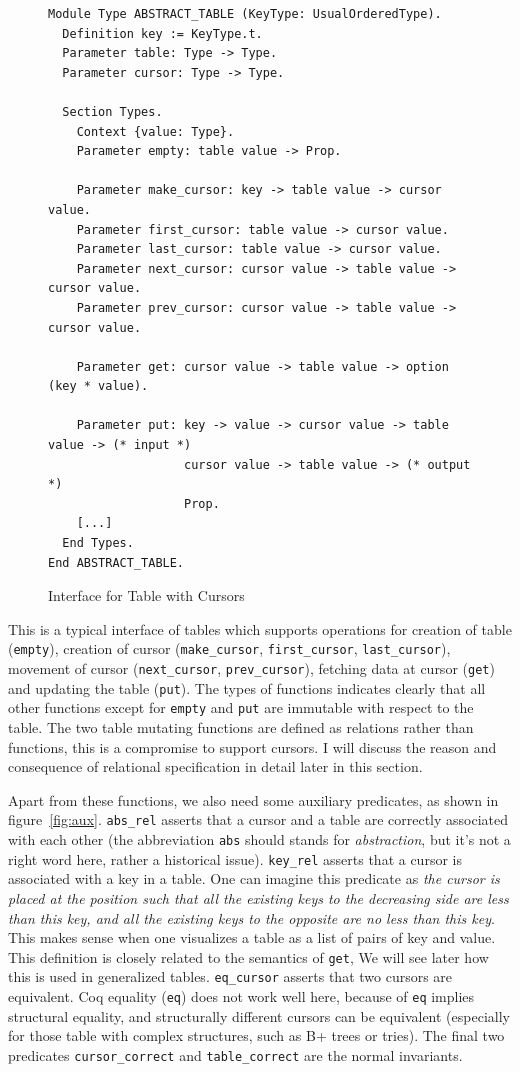 \documentclass[runningheads]{llncs}
\begin{document}
\begin{figure}[htbp]
  \centering
  \begin{verbatim}
Module Type ABSTRACT_TABLE (KeyType: UsualOrderedType).
  Definition key := KeyType.t.
  Parameter table: Type -> Type.
  Parameter cursor: Type -> Type.

  Section Types.
    Context {value: Type}.
    Parameter empty: table value -> Prop.

    Parameter make_cursor: key -> table value -> cursor value.
    Parameter first_cursor: table value -> cursor value.
    Parameter last_cursor: table value -> cursor value.
    Parameter next_cursor: cursor value -> table value -> cursor value.
    Parameter prev_cursor: cursor value -> table value -> cursor value.
    
    Parameter get: cursor value -> table value -> option (key * value).

    Parameter put: key -> value -> cursor value -> table value -> (* input *)
                   cursor value -> table value -> (* output *)
                   Prop.
    [...]
  End Types.
End ABSTRACT_TABLE.
\end{verbatim}
  \caption{Interface for Table with Cursors}\label{fig:interface}
\end{figure}

This is a typical interface of tables which supports operations for creation of
table (\texttt{empty}), creation of cursor (\texttt{make\_cursor},
\texttt{first\_cursor}, \texttt{last\_cursor}), movement of cursor
(\texttt{next\_cursor}, \texttt{prev\_cursor}), fetching data at
cursor (\texttt{get}) and updating the table (\texttt{put}). The types of
functions indicates clearly that all other functions except for \texttt{empty}
and \texttt{put} are immutable with respect to the table. The two table mutating
functions are defined as relations rather than functions, this is a compromise
to support cursors. I will discuss the reason and consequence of relational
specification in detail later in this section.

Apart from these functions, we also need some auxiliary predicates, as shown in
figure~\ref{fig:aux}. \texttt{abs\_rel} asserts that a cursor and a table are
correctly associated with each other (the abbreviation \texttt{abs} should
stands for \emph{abstraction}, but it's not a right word here, rather a
historical issue). \texttt{key\_rel} asserts that a cursor is associated with
a key in a table. One can imagine this predicate as \textit{the cursor is placed
at the position such that all the existing keys to the decreasing side are less
than this key, and all the existing keys to the opposite are no less than this
key}. This makes sense when one visualizes a table as a list of pairs of key and
value. This definition is closely related to the semantics of \texttt{get}, We
will see later how this is used in generalized tables. \texttt{eq\_cursor}
asserts that two cursors are equivalent. Coq equality (\texttt{eq}) does not
work well here, because of \texttt{eq} implies structural equality, and
structurally different cursors can be equivalent (especially for those table
with complex structures, such as B+ trees or tries). The final two predicates
\texttt{cursor\_correct} and \texttt{table\_correct} are the normal invariants.
\end{document}
